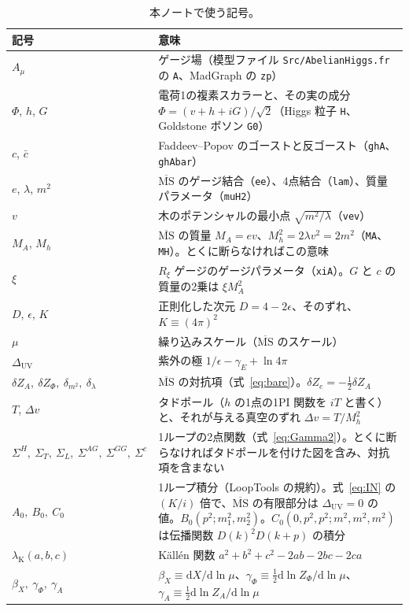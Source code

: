 \documentclass[a4paper,10pt]{ltjsarticle}
\newcommand{\dd}{\mathrm{d}}
\newcommand{\MSbar}{\overline{\mathrm{MS}}}
\newcommand{\DUV}{\Delta_{\mathrm{UV}}}
\newcommand{\lK}{\lambda_{\mathrm K}}
\begin{document}
\begin{table}[tbp]
\centering\small
\caption{本ノートで使う記号。}
\label{tab:notation}
\begin{tabularx}{\linewidth}{>{\raggedright\arraybackslash}p{4.5cm}X}
\toprule
\textbf{記号} & \textbf{意味} \\
\midrule
$A_\mu$ & ゲージ場（模型ファイル \texttt{Src/AbelianHiggs.fr} の \texttt{A}、MadGraph の \texttt{zp}） \\
$\Phi$, $h$, $G$ & 電荷1の複素スカラーと、その実の成分 $\Phi=(v+h+iG)/\sqrt2$（Higgs 粒子 \texttt{H}、Goldstone ボソン \texttt{G0}） \\
$c$, $\bar c$ & Faddeev--Popov のゴーストと反ゴースト（\texttt{ghA}、\texttt{ghAbar}） \\
$e$, $\lambda$, $m^2$ & $\MSbar$ のゲージ結合（\texttt{ee}）、4点結合（\texttt{lam}）、質量パラメータ（\texttt{muH2}） \\
$v$ & 木のポテンシャルの最小点 $\sqrt{m^2/\lambda}$（\texttt{vev}） \\
$M_A$, $M_h$ & $\MSbar$ の質量 $M_A=ev$、$M_h^2=2\lambda v^2=2m^2$（\texttt{MA}、\texttt{MH}）。とくに断らなければこの意味 \\
$\xi$ & $R_\xi$ ゲージのゲージパラメータ（\texttt{xiA}）。$G$ と $c$ の質量の2乗は $\xi M_A^2$ \\
$D$, $\epsilon$, $K$ & 正則化した次元 $D=4-2\epsilon$、そのずれ、$K\equiv(4\pi)^2$ \\
$\mu$ & 繰り込みスケール（$\MSbar$ のスケール） \\
$\DUV$ & 紫外の極 $1/\epsilon-\gamma_E+\ln4\pi$ \\
$\delta Z_A,\ \delta Z_\Phi,\ \delta_{m^2},\ \delta_\lambda$ & $\MSbar$ の対抗項（式~\eqref{eq:bare}）。$\delta Z_e=-\frac12\delta Z_A$ \\
$T$, $\Delta v$ & タドポール（$h$ の1点の1PI 関数を $iT$ と書く）と、それが与える真空のずれ $\Delta v=T/M_h^2$ \\
$\Sigma^H,\ \Sigma_T,\ \Sigma_L,\ \Sigma^{AG},\ \Sigma^{GG},\ \Sigma^c$ & 1ループの2点関数（式~\eqref{eq:Gamma2}）。とくに断らなければタドポールを付けた図を含み、対抗項を含まない \\
$A_0,\ B_0,\ C_0$ & 1ループ積分（LoopTools の規約）。式~\eqref{eq:IN} の $(K/i)$ 倍で、$\MSbar$ の有限部分は $\DUV=0$ の値。$B_0(p^2;m_1^2,m_2^2)$。$C_0(0,p^2,p^2;m^2,m^2,m^2)$ は伝播関数 $D(k)^2D(k+p)$ の積分 \\
$\lK(a,b,c)$ & Källén 関数 $a^2+b^2+c^2-2ab-2bc-2ca$ \\
$\beta_X,\ \gamma_\Phi,\ \gamma_A$ & $\beta_X\equiv\dd X/\dd\ln\mu$、$\gamma_\Phi\equiv\frac12\dd\ln Z_\Phi/\dd\ln\mu$、$\gamma_A\equiv\frac12\dd\ln Z_A/\dd\ln\mu$ \\

\end{tabularx}
\end{table}
\end{document}

